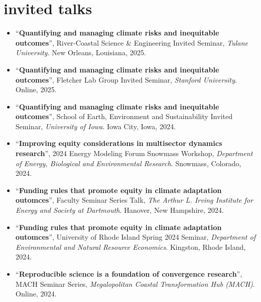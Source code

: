\documentclass[10pt,oneside]{article}
\begin{document}
\mbox{}\vspace{-\dimexpr\baselineskip\relax}
\vspace*{-1em}
\printbibliography[type=misc, heading=none]


\section{invited talks}

\mbox{}\vspace{-\dimexpr\baselineskip\relax}

\begin{itemize}[label={}]
  
  \item \enquote{\textbf{Quantifying and managing climate risks and inequitable outcomes}}, River-Coastal Science \& Engineering Invited Seminar,  \textit{Tulane University}. New Orleans, Louisiana, 2025.
  
  \item \enquote{\textbf{Quantifying and managing climate risks and inequitable outcomes}}, Fletcher Lab Group Invited Seminar,  \textit{Stanford University}. Online, 2025.
  
  \item \enquote{\textbf{Quantifying and managing climate risks and inequitable outcomes}}, School of Earth, Environment and Sustainability Invited Seminar,  \textit{University of Iowa}. Iowa City, Iowa, 2024.
  
  \item \enquote{\textbf{Improving equity considerations in multisector dynamics research}}, 2024 Energy Modeling Forum Snowmass Workshop,  \textit{Department of Energy, Biological and Environmental Research}. Snowmass, Colorado, 2024.
  
  \item \enquote{\textbf{Funding rules that promote equity in climate adaptation outomces}}, Faculty Seminar Series Talk,  \textit{The Arthur L. Irving Institute for Energy and Society at Dartmouth}. Hanover, New Hampshire, 2024.
  
  \item \enquote{\textbf{Funding rules that promote equity in climate adaptation outomces}}, University of Rhode Island Spring 2024 Seminar,  \textit{Department of Environmental and Natural Resource Economics}. Kingston, Rhode Island, 2024.
  
  \item \enquote{\textbf{Reproducible science is a foundation of convergence research}}, MACH Seminar Series,  \textit{Megalopolitan Coastal Transformation Hub (MACH)}. Online, 2024.
  

\end{itemize}
\end{document}
